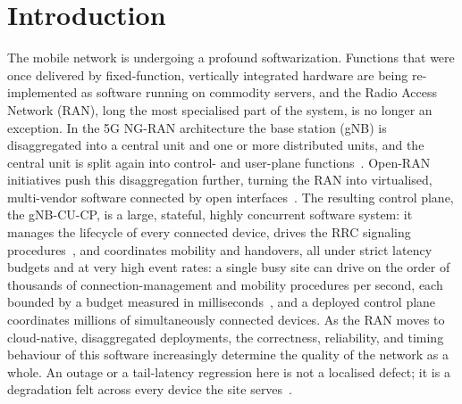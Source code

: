 \documentclass[english,twoside,openright,a4paper,censored,csm,software-track-2020]{HYthesisML}
\begin{document}
{\begin{otherlanguage}{english}
\begin{abstract}
\noindent\textbf{Conclusions.}
The thesis delivers a reproducible benchmarking framework, a parity-tested pair of
implementations, a defect-class taxonomy with its boundary, and a quantified migration cost.
The barrier to adopting Rust here is engineering effort and the learning curve rather than
run-time performance, and what is gained is freedom from data races rather than from
concurrency defects generally.
\end{abstract}
\end{otherlanguage}
}

\mytableofcontents

\mainmatter

\chapter{Introduction}

The mobile network is undergoing a profound softwarization. Functions that were once
delivered by fixed-function, vertically integrated hardware are being re-implemented as
software running on commodity servers, and the Radio Access Network (RAN), long the most
specialised part of the system, is no longer an exception. In the 5G NG-RAN architecture the
base station (gNB) is disaggregated into a central unit and one or more distributed units,
and the central unit is split again into control- and user-plane
functions~\cite{3gpp38401,3gpp38300}. Open-RAN initiatives push this disaggregation further,
turning the RAN into virtualised, multi-vendor software connected by open
interfaces~\cite{polese2023oran}. The resulting control plane, the gNB-CU-CP, is a large,
stateful, highly concurrent software system: it manages the lifecycle of every connected
device, drives the RRC signaling procedures~\cite{3gpp38331}, and coordinates mobility and
handovers, all under strict latency budgets and at very high event rates: a single busy site can drive on
the order of thousands of connection-management and mobility procedures per second, each
bounded by a budget measured in milliseconds~\cite{3gpp22261}, and a deployed control plane coordinates
millions of simultaneously connected devices. As the RAN moves to cloud-native,
disaggregated deployments, the correctness, reliability, and timing behaviour of this
software increasingly determine the quality of the network as a whole. An outage or a
tail-latency regression here is not a localised defect; it is a degradation felt across every
device the site serves~\cite{dean2013tail,barroso2017microseconds}.
\end{document}
